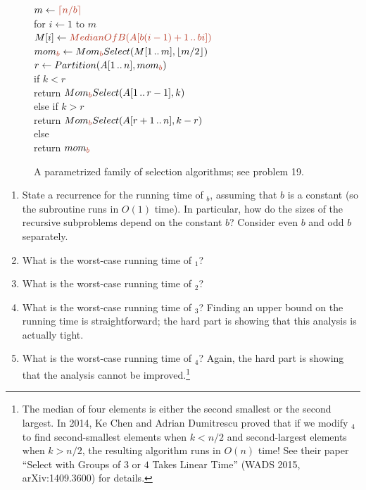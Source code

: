 \begin{exercises}
\begin{enumerate}[label=\arabic*.,ref=\thechapter.\arabic*,leftmargin=*,align=left,itemsep=1.5ex plus 0.5ex,resume]
\begin{figure}[ht]
\begin{pseudocode}
\Indent $m \gets {\color{JEred}\lceil n/b\rceil}$\\
\Indent for $i \gets 1$ to $m$\\
\Indent\Indent $M[i] \gets {\color{JEred}\Proc{MedianOfB}(A[b(i-1)+1\,..\,bi])}$\\
\Indent $\Var{mom}_{\color{JEred}b} \gets \Proc{Mom}_{\color{JEred}b}\Proc{Select}(M[1\,..\,m], \lfloor m/2\rfloor)$\\[2pt]
\Indent $r \gets \Proc{Partition}(A[1\,..\,n], \Var{mom}_{\color{JEred}b})$\\[2pt]
\Indent if $k < r$\\
\Indent\Indent return $\Proc{Mom}_{\color{JEred}b}\Proc{Select}(A[1\,..\,r-1], k)$\\
\Indent else if $k > r$\\
\Indent\Indent return $\Proc{Mom}_{\color{JEred}b}\Proc{Select}(A[r+1\,..\,n], k-r)$\\
\Indent else\\
\Indent\Indent return $\Var{mom}_{\color{JEred}b}$
\end{pseudocode}
\caption{A parametrized family of selection algorithms; see problem 19.}
\label{fig:1.22}
\end{figure}
\begin{enumerate}
\item State a recurrence for the running time of $_b$, assuming that $b$ is a constant (so the subroutine  runs in $O(1)$ time). In particular, how do the sizes of the recursive subproblems depend on the constant $b$? Consider even $b$ and odd $b$ separately.
\item What is the worst-case running time of $_1$? 
\item {} What is the worst-case running time of $_2$? 
\item {} What is the worst-case running time of $_3$? Finding an upper bound on the running time is straightforward; the hard part is showing that this analysis is actually tight. 
\item {} What is the worst-case running time of $_4$? Again, the hard part is showing that the analysis cannot be improved.\footnote{The median of four elements is either the second smallest or the second largest. In 2014, Ke Chen and Adrian Dumitrescu proved that if we modify $_4$ to find second-smallest elements when $k < n/2$ and second-largest elements when $k > n/2$, the resulting algorithm runs in $O(n)$ time! See their paper “Select with Groups of $3$ or $4$ Takes Linear Time” (WADS 2015, arXiv:1409.3600) for details.}

\end{enumerate}
\end{enumerate}
\end{exercises}
